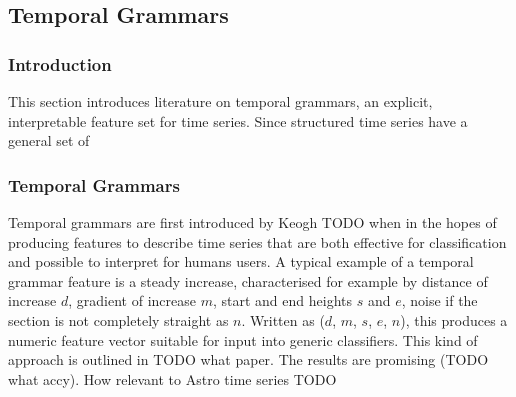 \documentclass[11pt]{article}
\begin{document}
	\subsection{Temporal Grammars}
	\subsubsection{Introduction}
	This section introduces literature on temporal grammars, an explicit, interpretable feature set for time series. Since structured time series have a general set of 
	\subsubsection{Temporal Grammars}
	Temporal grammars are first introduced by Keogh TODO when in the hopes of producing features to describe time series that are both effective for classification and possible to interpret for humans users. A typical example of a temporal grammar feature is a steady increase, characterised for example by distance of increase $d$, gradient of increase $m$, start and end heights $s$ and $e$, noise if the section is not completely straight as $n$. Written as ($d$, $m$, $s$, $e$, $n$), this produces a numeric feature vector suitable for input into generic classifiers. This kind of approach is outlined in TODO what paper. The results are promising (TODO what accy). How relevant to Astro time series TODO
\end{document}
